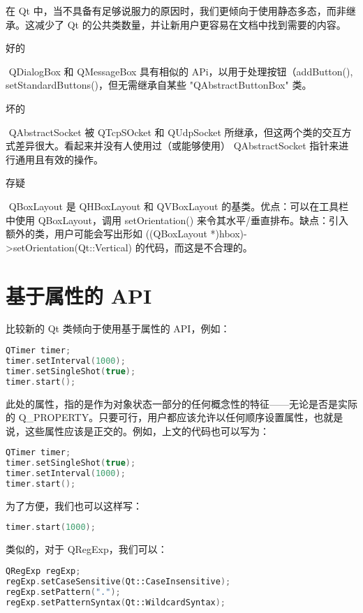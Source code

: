 在 Qt 中，当不具备有足够说服力的原因时，我们更倾向于使用静态多态，而非继承。这减少了 Qt 的公共类数量，并让新用户更容易在文档中找到需要的内容。

好的

​ QDialogBox 和 QMessageBox 具有相似的 APi，以用于处理按钮（addButton(), setStandardButtons()，但无需继承自某些 "QAbstractButtonBox" 类。

坏的

​ QAbstractSocket 被 QTcpSOcket 和 QUdpSocket 所继承，但这两个类的交互方式差异很大。看起来并没有人使用过（或能够使用） QAbstractSocket 指针来进行通用且有效的操作。

存疑

​ QBoxLayout 是 QHBoxLayout 和 QVBoxLayout 的基类。优点：可以在工具栏中使用 QBoxLayout，调用 setOrientation() 来令其水平/垂直排布。缺点：引入额外的类，用户可能会写出形如 ((QBoxLayout *)hbox)->setOrientation(Qt::Vertical) 的代码，而这是不合理的。

\section{基于属性的 API}

比较新的 Qt 类倾向于使用基于属性的 API，例如：

\begin{lstlisting}[language=C++]
QTimer timer;
timer.setInterval(1000);
timer.setSingleShot(true);
timer.start(); 
\end{lstlisting}

此处的属性，指的是作为对象状态一部分的任何概念性的特征——无论是否是实际的 Q\_PROPERTY。只要可行，用户都应该允许以任何顺序设置属性，也就是说，这些属性应该是正交的。例如，上文的代码也可以写为：

\begin{lstlisting}[language=C++]
QTimer timer;
timer.setSingleShot(true);
timer.setInterval(1000);
timer.start(); 
\end{lstlisting}

为了方便，我们也可以这样写：

\begin{lstlisting}[language=C++]
timer.start(1000);
\end{lstlisting}

类似的，对于 QRegExp，我们可以：

\begin{lstlisting}[language=C++]
QRegExp regExp;
regExp.setCaseSensitive(Qt::CaseInsensitive);
regExp.setPattern(".");
regExp.setPatternSyntax(Qt::WildcardSyntax);
\end{lstlisting}

